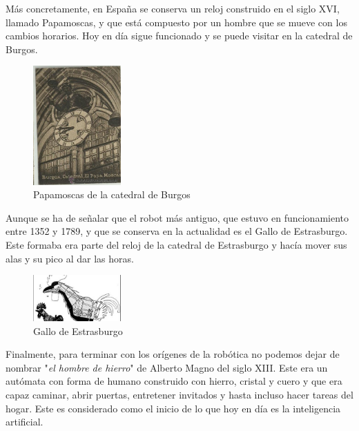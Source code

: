 Más concretamente, en España se conserva un reloj construido en el siglo XVI, llamado Papamoscas,  y que está compuesto por un hombre que se mueve con los cambios horarios. Hoy en día sigue funcionado y se puede visitar en la catedral de Burgos.

\begin{figure}[H]
\begin{center}
  \includegraphics[width=0.3\textwidth]{./EtapaPrimeriza/imagenes/papamoscas.jpg}
  \caption{Papamoscas de la catedral de Burgos}
  \label{papam}
\end{center}
\end{figure}


Aunque se ha de señalar que el robot más antiguo, que estuvo en funcionamiento entre 1352 y 1789, y que se conserva en la actualidad es el Gallo de Estrasburgo. Este formaba era parte del reloj de la catedral de Estrasburgo y hacía mover sus alas y su pico al dar las horas.

\begin{figure}[H]
\begin{center}
  \includegraphics[width=0.3\textwidth]{./EtapaPrimeriza/imagenes/gallo.jpg}
  \caption{Gallo de Estrasburgo}
  \label{gallo}
\end{center}
\end{figure}



Finalmente, para terminar con los orígenes de la robótica no podemos dejar de nombrar "\textit{el hombre de hierro}" de Alberto Magno del siglo XIII. Este era un autómata con forma de humano construido con hierro, cristal y cuero y que era capaz caminar, abrir puertas, entretener invitados y hasta incluso hacer tareas del hogar. Este es considerado como el inicio de lo que hoy en día es la inteligencia artificial.



